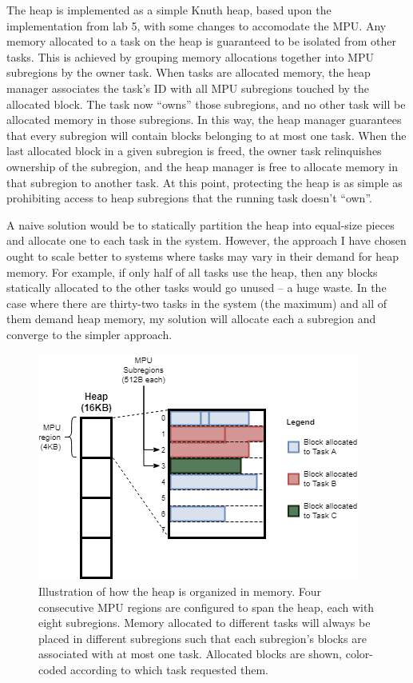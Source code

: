 The heap is implemented as a simple Knuth heap, based upon the implementation from lab 5, with some changes to accomodate the MPU. Any memory allocated to a task on the heap is guaranteed to be isolated from other tasks. This is achieved by grouping memory allocations together into MPU subregions by the owner task. When tasks are allocated memory, the heap manager associates the task's ID with all MPU subregions touched by the allocated block. The task now ``owns'' those subregions, and no other task will be allocated memory in those subregions. In this way, the heap manager guarantees that every subregion will contain blocks belonging to at most one task. When the last allocated block in a given subregion is freed, the owner task relinquishes ownership of the subregion, and the heap manager is free to allocate memory in that subregion to another task. At this point, protecting the heap is as simple as prohibiting access to heap subregions that the running task doesn't ``own''.

A naive solution would be to statically partition the heap into equal-size pieces and allocate one to each task in the system. However, the approach I have chosen ought to scale better to systems where tasks may vary in their demand for heap memory. For example, if only half of all tasks use the heap, then any blocks statically allocated to the other tasks would go unused -- a huge waste. In the case where there are thirty-two tasks in the system (the maximum) and all of them demand heap memory, my solution will allocate each a subregion and converge to the simpler approach.

\begin{figure}[hbtp]
	\centering
	\includegraphics[width=0.7\linewidth]{figs/heap_prot.png}
	\caption{Illustration of how the heap is organized in memory. Four consecutive MPU regions are configured to span the heap, each with eight subregions. Memory allocated to different tasks will always be placed in different subregions such that each subregion's blocks are associated with at most one task. Allocated blocks are shown, color-coded according to which task requested them.}
	\label{fig:heap_prot}
\end{figure}


